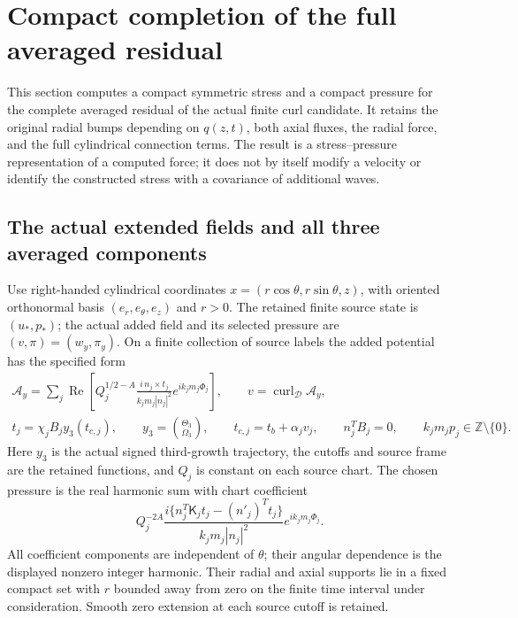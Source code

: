 \documentclass[11pt]{article}
\begin{document}
\section{Compact completion of the full averaged residual}
\label{mcstress:section}

This section computes a compact symmetric stress and a compact pressure
for the complete averaged residual of the actual finite curl candidate.
It retains the original radial bumps depending on $q(z,t)$, both axial
fluxes, the radial force, and the full cylindrical connection terms.
The result is a stress--pressure representation of a computed force;
it does not by itself modify a velocity or identify the constructed
stress with a covariance of additional waves.

\subsection{The actual extended fields and all three averaged components}

Use right-handed cylindrical coordinates
$x=(r\cos\theta,r\sin\theta,z)$, with oriented orthonormal basis
$(e_r,e_\theta,e_z)$ and $r>0$. The retained finite source state is
$(u_*,p_*)$; the actual added field and its selected pressure are
$(v,\pi)=(w_y,\pi_y)$. On a finite collection of source labels the
added potential has the specified form
\begin{equation}\label{mcstress:actual_potential}
\begin{gathered}
 \mathcal A_y=\sum_j\operatorname{Re}
   \left[Q_j^{1/2-A}
     \frac{i\,n_j\times t_j}{k_jm_j|n_j|^2}
                      e^{ik_jm_j\Phi_j}\right],\qquad
 v=\operatorname{curl}_{\mathscr D}\mathcal A_y,\\
 t_j=\chi_jB_jy_3(t_{c,j}),\qquad
 y_3=\binom{\Theta_3}{\Omega_3},\qquad
 t_{c,j}=t_b+\alpha_jv_j,\qquad
 n_j^TB_j=0,\qquad k_jm_jp_j\in\mathbb Z\setminus\{0\}.
\end{gathered}
\end{equation}
Here $y_3$ is the actual signed third-growth trajectory, the cutoffs
and source frame are the retained functions, and $Q_j$ is constant
on each source chart. The chosen pressure is the real harmonic sum
with chart coefficient
\[
 Q_j^{-2A}
 \frac{i\{n_j^T\mathsf K_jt_j-(n'_j)^Tt_j\}}
      {k_jm_j|n_j|^2}e^{ik_jm_j\Phi_j}.
\]
All coefficient components are independent of $\theta$; their angular
dependence is the displayed nonzero integer harmonic. Their radial
and axial supports lie in a fixed compact set with $r$ bounded away
from zero on the finite time interval under consideration. Smooth
zero extension at each source cutoff is retained.
\end{document}
